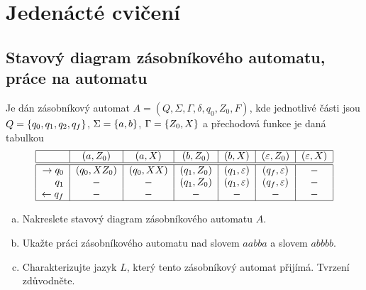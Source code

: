 \section{Jedenácté cvičení}

\subsection{Stavový diagram zásobníkového automatu, práce na automatu}
Je dán zásobníkový automat $A = (Q, \Sigma, \Gamma, \delta, q_0, Z_0, F)$, kde jednotlivé části jsou 
$Q = \left\lbrace q_0, q_1, q_2, q_f \right\rbrace$, $\Sigma = \left\lbrace a, b \right\rbrace$, $\Gamma =\left\lbrace Z_0, X \right\rbrace$ a přechodová funkce je daná tabulkou
\[
\begin{tabular}{|r|c|c|c|c|c|c|}
    \hline
    & $(a, Z_0)$ & $(a, X)$ & $(b, Z_0)$ & $(b, X)$ & $(\varepsilon, Z_0)$ & $(\varepsilon, X)$\\
    \hline
    \hline
    $\rightarrow q_0$& $(q_0, X Z_0)$ & $(q_0, XX)$ & $(q_1, Z_0)$ & $(q_1, \varepsilon)$ & $(q_f, \varepsilon)$ & $-$\\
    $q_1$            & $-$            & $-$         & $(q_1, Z_0)$ & $(q_1, \varepsilon)$ & $(q_f, \varepsilon)$ & $-$\\
    $\leftarrow q_f$ & $-$& $-$& $-$ & $-$ & $-$ & $-$\\
    \hline
\end{tabular}
\]

\begin{enumerate}[a), noitemsep]
    \item Nakreslete stavový diagram zásobníkového automatu $A$.
    \item Ukažte práci zásobníkového automatu nad slovem $aabba$ a slovem $abbbb$.
    \item Charakterizujte jazyk $L$, který tento zásobníkový automat přijímá. Tvrzení zdůvodněte.
\end{enumerate}


